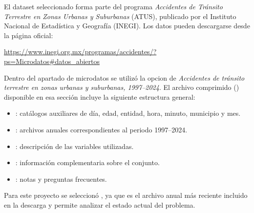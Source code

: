 \documentclass[11pt,letterpaper]{article}
\begin{document}
\begin{nota}
El dataset seleccionado forma parte del programa \textit{Accidentes de Tránsito
Terrestre en Zonas Urbanas y Suburbanas} (ATUS), publicado por el Instituto
Nacional de Estadística y Geografía (INEGI). Los datos pueden descargarse
desde la página oficial:

\begin{center}
    \url{https://www.inegi.org.mx/programas/accidentes/?ps=Microdatos#datos_abiertos}
\end{center}

\vspace{0.25em}
Dentro del apartado de microdatos se utilizó la opcion de 
\textit{Accidentes de tránsito terrestre en zonas urbanas y suburbanas,
1997--2024}. El archivo comprimido () disponible en esa sección incluye la
siguiente estructura general:

\begin{itemize}
    \item {}: catálogos auxiliares de día, edad, entidad, hora,
    minuto, municipio y mes.
    \item {}: archivos anuales correspondientes al
    periodo 1997--2024.
    \item {}: descripción de las variables utilizadas.
    \item {}: información complementaria sobre el conjunto.
    \item {}: notas y preguntas frecuentes.
\end{itemize}

Para este proyecto se seleccionó , ya que es el
archivo anual más reciente incluido en la descarga y permite analizar el estado
actual del problema.


\end{nota}
\end{document}
